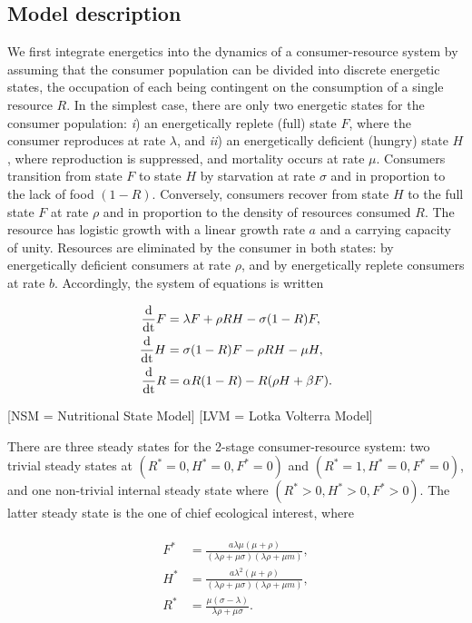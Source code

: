 \documentclass[12pt,english]{article}
\begin{document}
\begin{spacing}{1.9}
\subsection{Model description}

We first integrate energetics into the dynamics of a consumer-resource system by assuming that the consumer population can be divided into discrete energetic states, the occupation of each being contingent on the consumption of a single resource $R$.
In the simplest case, there are only two energetic states for the consumer population: \emph{i}) an energetically replete (full) state $F$, where the consumer reproduces at rate $\lambda$, and \emph{ii}) an energetically deficient (hungry) state $H$, where reproduction is suppressed, and mortality occurs at rate $\mu$.
Consumers transition from state $F$ to state $H$ by starvation at rate $\sigma$ and in proportion to the lack of food $(1-R)$.
Conversely, consumers recover from state $H$ to the full state $F$ at rate $\rho$ and in proportion to the density of resources consumed $R$.
The resource has logistic growth with a linear growth rate $a$ and a carrying capacity of unity.
Resources are eliminated by the consumer in both states: by energetically deficient consumers at rate $\rho$, and by energetically replete consumers at rate $b$.
Accordingly, the system of equations is written


\begin{align}
\begin{split}
\frac{\rm d}{\rm dt} F &= \lambda F + \rho RH - \sigma (1-R)F,  \\
\frac{\rm d}{\rm dt} H &= \sigma (1-R)F - \rho RH - \mu H,  \\
\frac{\rm d}{\rm dt} R &= \alpha R(1-R) - R(\rho H+ \beta F).
\label{eq_specific}
\end{split}
\end{align}

[NSM = Nutritional State Model]
[LVM = Lotka Volterra Model]


There are three steady states for the 2-stage consumer-resource system: two trivial steady states at $(R^*=0,H^*=0,F^*=0)$ and $(R^*=1,H^*=0,F^*=0)$, and one non-trivial internal steady state where $(R^*>0,H^*>0,F^*>0)$.
The latter steady state is the one of chief ecological interest, where

\begin{align}
\begin{split}
F^* &= \frac{a  \lambda  \mu  (\mu +\rho )}{(\lambda  \rho +\mu  \sigma ) (\lambda  \rho +\mu  m)}, \\
H^* &= \frac{a  \lambda ^2 (\mu +\rho )}{(\lambda  \rho +\mu  \sigma ) (\lambda  \rho +\mu  m)}, \\
R^* &= \frac{\mu  (\sigma -\lambda )}{\lambda  \rho +\mu  \sigma }.
\end{split}
\end{align}


\end{spacing}
\end{document}
